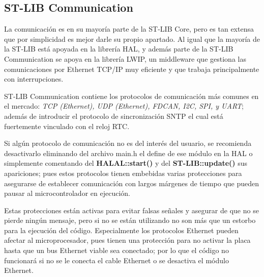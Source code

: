\documentclass{report}
\begin{document}
\subsection{ST-LIB Communication}
La comunicación es en su mayoría parte de la ST-LIB Core, pero es tan extensa que por simplicidad es mejor darle su propio apartado. Al igual que la mayoría de la ST-LIB está apoyada en la librería HAL, y además parte de la ST-LIB Communication se apoya en la librería LWIP, un middleware que gestiona las comunicaciones por Ethernet TCP/IP muy eficiente y que trabaja principalmente con interrupciones. 
\par \vspace{0.3cm}
ST-LIB Communication contiene los protocolos de comunicación más comunes en el mercado: \textit{TCP (Ethernet), UDP (Ethernet), FDCAN, I2C, SPI, y UART}; además de introducir el protocolo de sincronización SNTP el cual está fuertemente vinculado con el reloj RTC. \par \vspace{0.3cm}
Si algún protocolo de comunicación no es del interés del usuario, se recomienda desactivarlo eliminando del archivo main.h el define de ese módulo en la HAL o simplemente comentando del \textbf{HALAL::start()} y del \textbf{ST-LIB::update()} sus apariciones; pues estos protocolos tienen embebidas varias protecciones para asegurarse de establecer comunicación con largos márgenes de tiempo que pueden pausar al microcontrolador en ejecución. \par \vspace{0.3cm}
Estas protecciones están activas para evitar falsas señales y asegurar de que no se pierde ningún mensaje, pero si no se están utilizando no son más que un estorbo para la ejecución del código. Especialmente los protocolos Ethernet pueden afectar al microprocesador, pues tienen una protección para no activar la placa hasta que un bus Ethernet viable sea conectado; por lo que el código no funcionará si no se le conecta el cable Ethernet o se desactiva el módulo Ethernet. 
\end{document}
